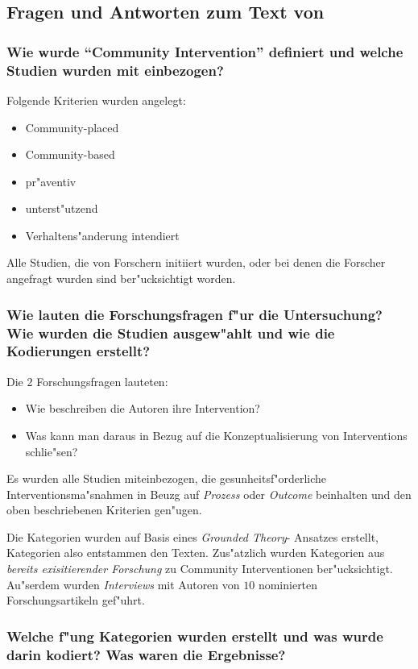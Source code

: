 \subsection{Fragen und Antworten zum Text von \textcite{trickett_how_2011}}
\subsubsection{Wie wurde ``Community Intervention'' definiert und welche Studien wurden mit einbezogen?}
Folgende Kriterien wurden angelegt:
\begin{itemize}
        \item Community-placed
        \item Community-based
        \item pr"aventiv
        \item unterst"utzend
        \item Verhaltens"anderung intendiert
\end{itemize}

Alle Studien, die von Forschern initiiert wurden, oder bei denen die Forscher angefragt wurden sind ber"ucksichtigt worden.

\subsubsection{Wie lauten die Forschungsfragen f"ur die Untersuchung? Wie wurden die Studien ausgew"ahlt und wie die Kodierungen erstellt?}
Die 2 Forschungsfragen lauteten:
\begin{itemize}
        \item Wie beschreiben die Autoren ihre Intervention?
        \item Was kann man daraus in Bezug auf die Konzeptualisierung von Interventions schlie"sen?
\end{itemize}
Es wurden alle Studien miteinbezogen, die gesunheitsf"orderliche Interventionsma"snahmen in Beuzg auf \emph{Prozess} oder \emph{Outcome} beinhalten und den oben beschriebenen Kriterien gen"ugen.

Die Kategorien wurden auf Basis eines \emph{Grounded Theory}- Ansatzes erstellt, Kategorien also entstammen den Texten. Zus"atzlich wurden Kategorien aus \emph{bereits exisitierender Forschung} zu Community Interventionen ber"ucksichtigt. Au"serdem wurden \emph{Interviews} mit Autoren von $10$ nominierten Forschungsartikeln gef"uhrt.

\subsubsection{Welche f"ung Kategorien wurden erstellt und was wurde darin kodiert? Was waren die Ergebnisse?}

